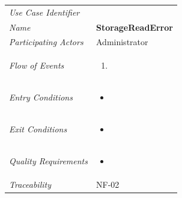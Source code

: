 \documentclass[12pt,letterpaper]{article}
\begin{document}
\begin{center}
	\begin{tabu} to 
		\toprule
		Use Case Identifier & \storagereaderror{} \\
		Name & {\bf StorageReadError} \\
		Participating Actors & Administrator \\
		Flow of Events & 
	    \begin{enumerate}[topsep=-1em,leftmargin=*]
		    \item 
		\end{enumerate} \\

		Entry Conditions &
		\begin{itemize}[topsep=-1em,leftmargin=*]
		    \item 
        \end{itemize} \\

		Exit Conditions &
		\begin{itemize}[topsep=-1em,leftmargin=*]
		    \item 
        \end{itemize} \\

		Quality Requirements &
		\begin{itemize}[topsep=-1em,leftmargin=*]
		    \item 
        \end{itemize} \\

		Traceability & NF-02 \\
		\toprule
	\end{tabu}
\end{center}
\end{document}
